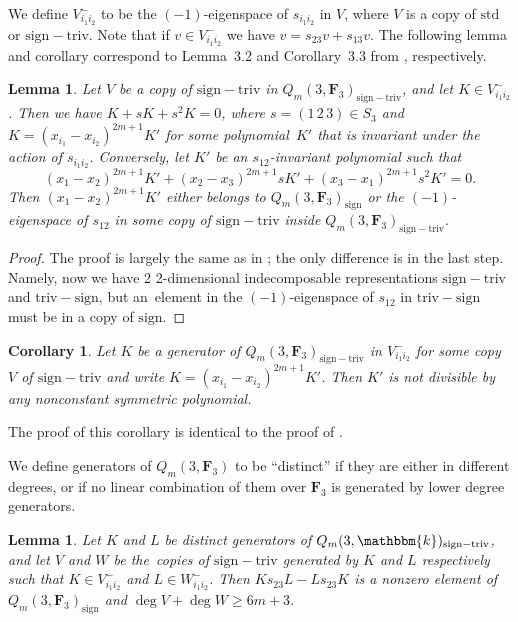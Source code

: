 \documentclass[pdftex]{sigma}
\newtheorem{Corollary}[Theorem]{Corollary}
\newtheorem{Lemma}[Theorem]{Lemma}
\theoremstyle{definition}
\numberwithin{equation}{section}
\renewcommand{\k}{\mathbbm{k}}
\newcommand{\std}{\mathrm{std}}
\newcommand{\sign}{\mathrm{sign}}
\newcommand{\siv}{\mathrm{sign-triv}}
\newcommand{\tign}{\mathrm{triv-sign}}
\begin{document}
We define $V_{i_1i_2}^{-}$ to be the $(-1)$-eigenspace of $s_{i_1i_2}$ in $V$, where $V$ is a copy of $\std$ or $\siv$. Note that if $v\in V_{i_1i_2}^{-}$ we have $v=s_{23}v+s_{13}v$. The following lemma and corollary correspond to Lemma~3.2 and Corollary~3.3 from \cite{wang2022explicit}, respectively.

\begin{Lemma}\label{lem:3.1}
 Let $V$ be a copy of $\siv$ in $Q_m(3,\mathbf{F}_3)_{\siv}$, and let $K\in V_{i_1i_2}^{-}$. Then we have $K+sK+s^2K=0$, where $s=(1\,2\,3)\in S_3$ and $K=(x_{i_1}-x_{i_2})^{2m+1}K'$ for some polynomial~$K'$ that is invariant under the action of $s_{i_1i_2}$. Conversely, let $K'$ be an $s_{12}$-invariant polynomial such that
 \[(x_1-x_2)^{2m+1}K'+(x_2-x_3)^{2m+1}sK'+(x_3-x_1)^{2m+1}s^2K'=0.\]
 Then $(x_1-x_2)^{2m+1}K'$ either belongs to $Q_m(3,\mathbf{F}_3)_\sign$ or the $(-1)$-eigenspace of $s_{12}$ in some copy of $\siv$ inside $Q_m(3,\mathbf{F}_3)_\siv$.
\end{Lemma}

\begin{proof}
 The proof is largely the same as in \cite{wang2022explicit}; the only difference is in the last step. Namely, now we have 2 2-dimensional indecomposable representations $\siv$ and $\tign$, but an~element in the $(-1)$-eigenspace of $s_{12}$ in $\tign$ must be in a copy of $\sign$.
\end{proof}

\begin{Corollary}\label{cor:3.2}
 Let $K$ be a generator of $Q_m(3,\mathbf{F}_3)_\siv$ in $V_{i_1i_2}^-$ for some copy $V$ of $\siv$ and write $K=(x_{i_1}-x_{i_2})^{2m+1}K'$. Then $K'$ is not divisible by any nonconstant symmetric polynomial.
\end{Corollary}

The proof of this corollary is identical to the proof of \cite[Corollary 3.3]{wang2022explicit}.

We define generators of $Q_m(3,\mathbf{F}_3)$ to be ``distinct'' if they are either in different degrees, or if no linear combination of them over $\mathbf{F}_3$ is generated by lower degree generators.

\begin{Lemma}\label{lem:3.3}
 Let $K$ and $L$ be distinct generators of $Q_m(3,\k)_\siv$, and let $V$ and $W$ be the~copies of $\siv$ generated by $K$ and $L$ respectively such that $K\in V_{i_1i_2}^{-}$ and $L\in W_{i_1i_2}^{-}$. Then $Ks_{23}L - Ls_{23}K$ is a nonzero element of $Q_m(3,\mathbf{F}_3)_{\sign}$ and $\deg V+\deg W\geq 6m+3$.
\end{Lemma}
\end{document}

